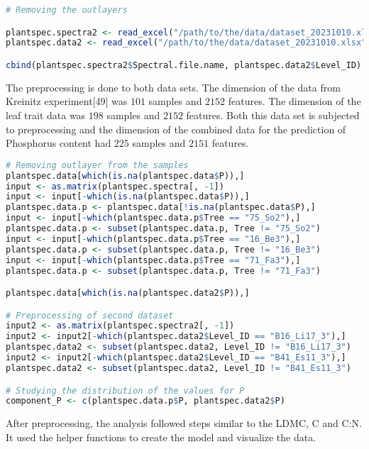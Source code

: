\documentclass[12pt,a4paper]{report}
\begin{document}
\begin{lstlisting}[language=R, style=mystyle]
# Removing the outlayers

plantspec.spectra2 <- read_excel("/path/to/the/data/dataset_20231010.xlsx", sheet = "Kreinitz set spectra") # Spectral Kreinitz set
plantspec.data2 <- read_excel("/path/to/the/data/dataset_20231010.xlsx", sheet = "Kreinitz set traits") # Traits Kreinitz set

cbind(plantspec.spectra2$Spectral.file.name, plantspec.data2$Level_ID) # Checking correlation between both sets
\end{lstlisting}

The preprocessing is done to both data sets. The dimension of the data from Kreinitz experiment[49] was $101$ samples and $2152$ features. The dimension of the leaf trait data was $198$ samples and $2152$ features. Both this data set is subjected to preprocessing and the dimension of the combined data for the prediction of Phosphorus content had $225$ samples and $2151$ features.  \\

\begin{lstlisting}[language=R, style=mystyle]
# Removing outlayer from the samples
plantspec.data[which(is.na(plantspec.data$P)),]
input <- as.matrix(plantspec.spectra[, -1])
input <- input[-which(is.na(plantspec.data$P)),]
plantspec.data.p <- plantspec.data[!is.na(plantspec.data$P),]
input <- input[-which(plantspec.data.p$Tree == "75_So2"),]
plantspec.data.p <- subset(plantspec.data.p, Tree != "75_So2")
input <- input[-which(plantspec.data.p$Tree == "16_Be3"),]
plantspec.data.p <- subset(plantspec.data.p, Tree != "16_Be3")
input <- input[-which(plantspec.data.p$Tree == "71_Fa3"),]
plantspec.data.p <- subset(plantspec.data.p, Tree != "71_Fa3")

plantspec.data[which(is.na(plantspec.data2$P)),]

# Preprocessing of second dataset
input2 <- as.matrix(plantspec.spectra2[, -1])
input2 <- input2[-which(plantspec.data2$Level_ID == "B16_Li17_3"),]
plantspec.data2 <- subset(plantspec.data2, Level_ID != "B16_Li17_3")
input2 <- input2[-which(plantspec.data2$Level_ID == "B41_Es11_3"),]
plantspec.data2 <- subset(plantspec.data2, Level_ID != "B41_Es11_3")

# Studying the distribution of the values for P
component_P <- c(plantspec.data.p$P, plantspec.data2$P)
\end{lstlisting}

After preprocessing, the analysis followed steps similar to the LDMC, C and C:N. It used the helper functions to create the model and visualize the data. 
\end{document}
